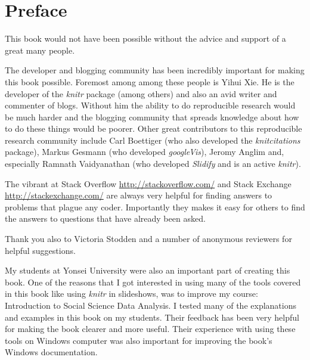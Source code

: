 


\chapter*{Preface}


\noindent This book would not have been possible without the advice and support of a great many people.

The developer and blogging community has been incredibly important for making this book possible. Foremost among among these people is Yihui Xie. He is the developer of the {\emph{knitr}} package (among others) and also an avid writer and commenter of blogs. Without him the ability to do reproducible research would be much harder and the blogging community that spreads knowledge about how to do these things would be poorer. Other great contributors to this reproducible research community include Carl Boettiger (who also developed the {\emph{knitcitations}} package), Markus Gesmann (who developed {\emph{googleVis}}), Jeromy Anglim and, especially Ramnath Vaidyanathan (who developed {\emph{Slidify}} and is an active {\emph{knitr}}).

The vibrant at Stack Overflow \url{http://stackoverflow.com/} and Stack Exchange \url{http://stackexchange.com/} are always very helpful for finding answers to problems that plague any coder. Importantly they makes it easy for others to find the answers to questions that have already been asked.

Thank you also to Victoria Stodden and a number of anonymous reviewers for helpful suggestions.

My students at Yonsei University were also an important part of creating this book. One of the reasons that I got interested in using many of the tools covered in this book like using {\emph{knitr}} in slideshows, was to improve my course: Introduction to Social Science Data Analysis. I tested many of the explanations and examples in this book on my students. Their feedback has been very helpful for making the book clearer and more useful. Their experience with using these tools on Windows computer was also important for improving the book's Windows documentation.
